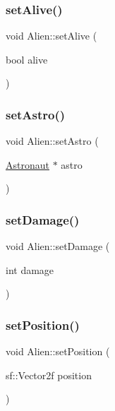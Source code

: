 \mbox{\label{class_alien_a1f8e8072e38c88e7299867ce08e169f4}} 
\subsubsection{\texorpdfstring{set\+Alive()}{setAlive()}}
{\footnotesize\ttfamily void Alien\+::set\+Alive (\begin{DoxyParamCaption}\item[{bool}]{alive }\end{DoxyParamCaption})}

\mbox{\label{class_alien_a23b7f6d84b71e233834a36ee37e90b14}} 
\subsubsection{\texorpdfstring{set\+Astro()}{setAstro()}}
{\footnotesize\ttfamily void Alien\+::set\+Astro (\begin{DoxyParamCaption}\item[{\hyperlink{class_astronaut}{Astronaut} $\ast$}]{astro }\end{DoxyParamCaption})}

\mbox{\label{class_alien_a5f1364d7d592e43230971365bb58d5a3}} 
\subsubsection{\texorpdfstring{set\+Damage()}{setDamage()}}
{\footnotesize\ttfamily void Alien\+::set\+Damage (\begin{DoxyParamCaption}\item[{int}]{damage }\end{DoxyParamCaption})}

\mbox{\label{class_alien_a751c54dcc0d77d92c6540b05b0fef50a}} 
\subsubsection{\texorpdfstring{set\+Position()}{setPosition()}}
{\footnotesize\ttfamily void Alien\+::set\+Position (\begin{DoxyParamCaption}\item[{sf\+::\+Vector2f}]{position }\end{DoxyParamCaption})}

